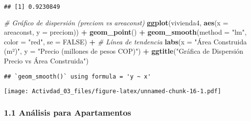 \documentclass[
]{article}
\newenvironment{Shaded}{\begin{snugshade}}{\end{snugshade}}
\newcommand{\AttributeTok}[1]{\textcolor[rgb]{0.13,0.29,0.53}{#1}}
\newcommand{\CommentTok}[1]{\textcolor[rgb]{0.56,0.35,0.01}{\textit{#1}}}
\newcommand{\ConstantTok}[1]{\textcolor[rgb]{0.56,0.35,0.01}{#1}}
\newcommand{\FunctionTok}[1]{\textcolor[rgb]{0.13,0.29,0.53}{\textbf{#1}}}
\newcommand{\NormalTok}[1]{#1}
\newcommand{\OtherTok}[1]{\textcolor[rgb]{0.56,0.35,0.01}{#1}}
\newcommand{\SpecialCharTok}[1]{\textcolor[rgb]{0.81,0.36,0.00}{\textbf{#1}}}
\newcommand{\StringTok}[1]{\textcolor[rgb]{0.31,0.60,0.02}{#1}}
\begin{document}
\begin{Shaded}
\end{Shaded}

\begin{verbatim}
## [1] 0.9230849
\end{verbatim}

\begin{Shaded}
\begin{Highlighting}[]
\CommentTok{\# Gráfico de dispersión (preciom vs areaconst)}
\FunctionTok{ggplot}\NormalTok{(vivienda4, }\FunctionTok{aes}\NormalTok{(}\AttributeTok{x =}\NormalTok{ areaconst, }\AttributeTok{y =}\NormalTok{ preciom)) }\SpecialCharTok{+}
  \FunctionTok{geom\_point}\NormalTok{() }\SpecialCharTok{+}
  \FunctionTok{geom\_smooth}\NormalTok{(}\AttributeTok{method =} \StringTok{"lm"}\NormalTok{, }\AttributeTok{color =} \StringTok{"red"}\NormalTok{, }\AttributeTok{se =} \ConstantTok{FALSE}\NormalTok{) }\SpecialCharTok{+}  \CommentTok{\# Línea de tendencia}
  \FunctionTok{labs}\NormalTok{(}\AttributeTok{x =} \StringTok{"Área Construida (m²)"}\NormalTok{, }\AttributeTok{y =} \StringTok{"Precio (millones de pesos COP)"}\NormalTok{) }\SpecialCharTok{+}
  \FunctionTok{ggtitle}\NormalTok{(}\StringTok{"Gráfica de Dispersión Precio vs Área Construida"}\NormalTok{)}
\end{Highlighting}
\end{Shaded}

\begin{verbatim}
## `geom_smooth()` using formula = 'y ~ x'
\end{verbatim}

\texttt{[image: Activdad\_03\_files/figure-latex/unnamed-chunk-16-1.pdf]}

\subsubsection{1.1 Análisis para
Apartamentos}\label{anuxe1lisis-para-apartamentos}

\begin{Shaded}
\end{Shaded}
\end{document}
